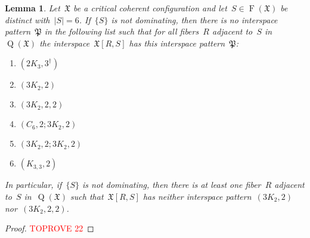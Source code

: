 \documentclass[english,a4paper]{article}
\theoremstyle{plain}
\newtheorem{lemma}      [theorem]{Lemma}
\theoremstyle{definition}
\newcommand{\abs}[1]{| #1 |}
\DeclareMathOperator{\Fibers}{F}
\newcommand{\coherentConfig}{\ensuremath{\mathfrak{X}}}
\newcommand{\fibers}[1]{\ensuremath{\Fibers \left( #1 \right)}}
\newcommand{\interspace}[2]{\ensuremath{\coherentConfig[#1,#2]}}
\DeclareMathOperator*{\Quotient}{Q}
\newcommand{\quotientGraph}[1]{\ensuremath{\Quotient(#1)}}
\newcommand{\ipsixMatching}             {\ensuremath{(\disjointCliques{3}{2},2)}}
\newcommand{\ipsixMatchingTwice}        {\ensuremath{(\disjointCliques{3}{2},2,2)}}
\newcommand{\ipsixMatchingMatching}     {\ensuremath{(\disjointCliques{3}{2},2;\disjointCliques{3}{2},2)}}
\newcommand{\ipsixMatchingAndCycle}     {\ensuremath{(\cycle{6},2;\disjointCliques{3}{2},2)}}
\newcommand{\ipsixTriangle}               {\ensuremath{(\disjointCliques{2}{3},3^\dag)}}
\newcommand{\ipsixTriangleComplement}     {\ensuremath{(\clique{3,3},2)}}
\newcommand{\clique}[1]{\ensuremath{K_{#1}}}
\newcommand{\cycle}[1]{\ensuremath{C_{#1}}}
\newcommand{\disjointCliques}[2]{\ensuremath{#1 \clique{#2}}}
\begin{document}
\begin{lemma}
\label{critical:6-cc:restorable:DUC:deg1/lem}
    Let~$\coherentConfig$ be a critical coherent configuration and let~$S \in \fibers{\coherentConfig}$ be distinct with~$\abs{S} = 6$.
    If~$\{S\}$ is not dominating, then there is no interspace pattern~$\mathfrak{P}$ in the following list such that for all fibers~$R$ adjacent to~$S$ in~$\quotientGraph{\coherentConfig}$ the interspace~$\interspace{R}{S}$ has this interspace pattern~$\mathfrak{P}$:
    \begin{multicols}{3}
        \begin{enumerate}
            \item $\ipsixTriangle$
            \item $\ipsixMatching$
            \item $\ipsixMatchingTwice$
            \item $\ipsixMatchingAndCycle$
            \item $\ipsixMatchingMatching$
            \item $\ipsixTriangleComplement$
        \end{enumerate}
    \end{multicols}
    In particular, if~$\{S\}$ is not dominating, then there is at least one fiber~$R$ adjacent to~$S$ in~$\quotientGraph{\coherentConfig}$ such that~$\interspace{R}{S}$ has neither interspace pattern~$\ipsixMatching$ nor~$\ipsixMatchingTwice$.
\end{lemma}
\begin{proof}\textcolor{red}{TOPROVE 22}\end{proof}
\end{document}
